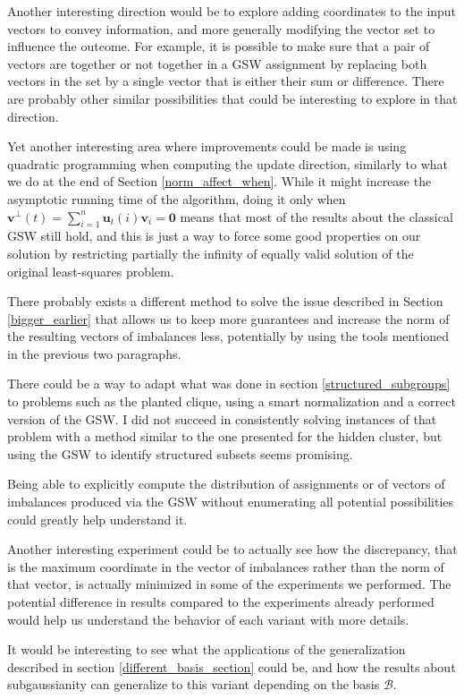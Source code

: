\documentclass[12pt]{article}
\begin{document}
Another interesting direction would be to explore adding coordinates to the input vectors to convey information, and more generally modifying the vector set to influence the outcome. For example, it is possible to make sure that a pair of vectors are together or not together in a GSW assignment by replacing both vectors in the set by a single vector that is either their sum or difference. There are probably other similar possibilities that could be interesting to explore in that direction.

Yet another interesting area where improvements could be made is using quadratic programming when computing the update direction, similarly to what we do at the end of Section \ref{norm_affect_when}. While it might increase the asymptotic running time of the algorithm, doing it only when $\textbf{v}^\perp(t)=\sum_{i=1}^n\textbf{u}_t(i)\textbf{v}_i=\textbf{0}$ means that most of the results about the classical GSW still hold, and this is just a way to force some good properties on our solution by restricting partially the infinity of equally valid solution of the original least-squares problem.

There probably exists a different method to solve the issue described in Section \ref{bigger_earlier} that allows us to keep more guarantees and increase the norm of the resulting vectors of imbalances less, potentially by using the tools mentioned in the previous two paragraphs.

There could be a way to adapt what was done in section \ref{structured_subgroups} to problems such as the planted clique, using a smart normalization and a correct version of the GSW. I did not succeed in consistently solving instances of that problem with a method similar to the one presented for the hidden cluster, but using the GSW to identify structured subsets seems promising.

Being able to explicitly compute the distribution of assignments or of vectors of imbalances produced via the GSW without enumerating all potential possibilities could greatly help understand it.

Another interesting experiment could be to actually see how the discrepancy, that is the maximum coordinate in the vector of imbalances rather than the norm of that vector, is actually minimized in some of the experiments we performed. The potential difference in results compared to the experiments already performed would help us understand the behavior of each variant with more details.

It would be interesting to see what the applications of the generalization described in section \ref{different_basis_section} could be, and how the results about subgaussianity can generalize to this variant depending on the basis $\mathcal{B}$.
\end{document}
